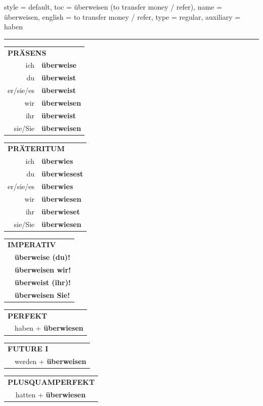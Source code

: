 \begin{verbentry}{
  style = {default},
  toc = {überweisen (to transfer money / refer)},
  name = {überweisen},
  english = {to transfer money / refer},
  type = {regular},
  auxiliary = {haben}
}


\vspace{5pt}
\hrule
\vspace{5pt}

\begin{tabular}{rl}
\multicolumn{2}{l}{\textbf{PRÄSENS}}\\
ich & \textbf{überweise}\\
du & \textbf{überweist}\\
er/sie/es & \textbf{überweist}\\
wir & \textbf{überweisen}\\
ihr & \textbf{überweist}\\
sie/Sie & \textbf{überweisen}\\
\end{tabular}
\hfill
\begin{tabular}{rl}
\multicolumn{2}{l}{\textbf{PRÄTERITUM}}\\
ich & \textbf{überwies}\\
du & \textbf{überwiesest}\\
er/sie/es & \textbf{überwies}\\
wir & \textbf{überwiesen}\\
ihr & \textbf{überwieset}\\
sie/Sie & \textbf{überwiesen}\\
\end{tabular}
\hfill
\begin{tabular}{rl}
\multicolumn{2}{l}{\textbf{IMPERATIV}}\\
& \textbf{überweise (du)!}\\
& \textbf{überweisen wir!}\\
& \textbf{überweist (ihr)!}\\
& \textbf{überweisen Sie!}\\
\end{tabular}

\vspace{10pt}

\begin{tabular}{rl}
\multicolumn{2}{l}{\textbf{PERFEKT}}\\
& haben + \textbf{überwiesen}\\
\end{tabular}
\hfill
\begin{tabular}{rl}
\multicolumn{2}{l}{\textbf{FUTURE I}}\\
& werden + \textbf{überweisen}\\
\end{tabular}
\hfill
\begin{tabular}{rl}
\multicolumn{2}{l}{\textbf{PLUSQUAMPERFEKT}}\\
& hatten + \textbf{überwiesen}\\
\end{tabular}


\end{verbentry}
